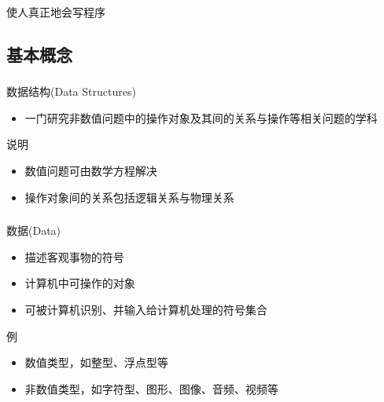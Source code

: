 \begin{standout}[\insertsubsectionhead]
	使人真正地会写程序
\end{standout}

\subsection{基本概念}

\begin{fragile}
	\frametitle{\insertsubsectionhead}
	\begin{block}{数据结构(Data Structures)}
		\begin{itemize}
			\item 一门研究\alert{非数值}问题中的操作对象及其间的\alert{关系}与\alert{操作}等相关问题的学科
		\end{itemize}
	\end{block}
	\pause
	\begin{exampleblock}{说明}
		\begin{itemize}
			\item<2-> \alert{数值}问题可由\alert{数学方程}解决
			\item<3-> 操作对象间的关系包括\alert{逻辑}关系与\alert{物理}关系
		\end{itemize}
	\end{exampleblock}
\end{fragile}

\begin{frame}
	\frametitle{\insertsubsectionhead}
	\begin{block}{数据(Data)}
		\begin{itemize}
			\item 描述客观事物的符号
			\item 计算机中可\alert{操作}的对象
			\item 可被计算机\alert{识别}、并输入给计算机\alert{处理}的符号集合
		\end{itemize}
	\end{block}
	\pause
	\begin{exampleblock}{例}
		\begin{itemize}
			\item 数值类型，如\alert{整型、浮点型}等
			\item 非数值类型，如\alert{字符型、图形、图像、音频、视频}等
		\end{itemize}
	\end{exampleblock}
\end{frame}

